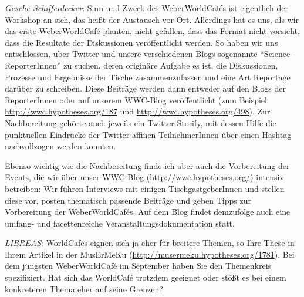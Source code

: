 \documentclass[a4paper,
fontsize=11pt,
oneside,
numbers=noperiodatend,
parskip=half-,
bibliography=totoc,
final
]{scrartcl}
\begin{document}
\emph{Gesche Schifferdecker}: Sinn und Zweck des WeberWorldCafés ist
eigentlich der Workshop an sich, das heißt der Austausch vor Ort.
Allerdings hat es uns, als wir das erste WeberWorldCafé planten, nicht
gefallen, dass das Format nicht vorsieht, dass die Resultate der
Diskussionen veröffentlicht werden. So haben wir uns entschlossen, über
Twitter und unsere verschiedenen Blogs sogenannte
\enquote{Science-ReporterInnen} zu suchen, deren originäre Aufgabe es
ist, die Diskussionen, Prozesse und Ergebnisse der Tische
zusammenzufassen und eine Art Reportage darüber zu schreiben. Diese
Beiträge werden dann entweder auf den Blogs der ReporterInnen oder auf
unserem WWC-Blog veröffentlicht (zum Beispiel
\url{http://wwc.hypotheses.org/187} und
\url{http://wwc.hypotheses.org/498}). Zur Nachbereitung gehörte auch
jeweils ein Twitter-Storify, mit dessen Hilfe die punktuellen Eindrücke
der Twitter-affinen TeilnehmerInnen über einen Hashtag nachvollzogen
werden konnten.

Ebenso wichtig wie die Nachbereitung finde ich aber auch die
Vorbereitung der Events, die wir über unser WWC-Blog
(\url{http://wwc.hypotheses.org/}) intensiv betreiben: Wir führen
Interviews mit einigen TischgastgeberInnen und stellen diese vor, posten
thematisch passende Beiträge und geben Tipps zur Vorbereitung der
WeberWorldCafés. Auf dem Blog findet demzufolge auch eine umfang- und
facettenreiche Veranstaltungsdokumentation statt.

\emph{LIBREAS}: WorldCafés eignen sich ja eher für breitere Themen, so
Ihre These in Ihrem Artikel in der MusErMeKu
(\url{http://musermeku.hypotheses.org/1781}). Bei dem jüngsten
WeberWorldCafé im September haben Sie den Themenkreis spezifiziert. Hat
sich das WorldCafé trotzdem geeignet oder stößt es bei einem konkreteren
Thema eher auf seine Grenzen?
\end{document}
